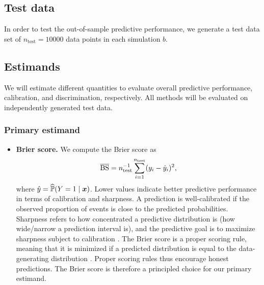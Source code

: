\subsection*{Test data}
In order to test the out-of-sample predictive performance, we generate a test data set of
$n_{\text{test}} = 10000$ data points in each simulation $b$.

\subsection{Estimands} \label{sec:estimands}
We will estimate different quantities to evaluate overall predictive performance,
calibration, and discrimination, respectively. All methods will be evaluated on
independently generated test data.

\subsubsection{Primary estimand}

\begin{itemize}
  \item \textbf{Brier score.} We compute the Brier score as
  $$\operatorname{\overline{BS}} = n_{\text{test}}^{-1} \sum_{i=1}^{n_{\text{test}}} (y_{i} - \hat{y}_{i})^2,$$
  where $\hat{y} = \widehat{\mathbb{P}}(Y = 1 \mid \text{\boldmath$x$})$.
  Lower values indicate better predictive performance in terms of calibration and
  sharpness. A prediction is well-calibrated if the observed proportion
  of events is close to the predicted probabilities. Sharpness refers to how
  concentrated a predictive distribution is (\eg how wide/narrow a prediction interval is),
  and the predictive goal is to maximize sharpness subject to calibration
  \citep{Gneiting2008}.
  The Brier score is a proper scoring rule, meaning that it is minimized if a
  predicted distribution is equal to the data-generating distribution
  \citep{Gneiting2007}. Proper scoring rules thus encourage honest
  predictions. The Brier score is therefore a principled choice for our primary estimand.
\end{itemize}

